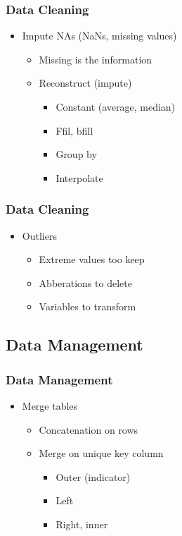 \begin{frame}\frametitle{Data Cleaning}
   \begin{itemize}
      \item Impute NAs (NaNs, missing values)
      \begin{itemize}
         \item Missing is the information
         \item Reconstruct (impute)
         \begin{itemize}
            \item Constant (average, median)
            \item Ffil, bfill
            \item Group by
            \item Interpolate
         \end{itemize}
      \end{itemize}
   \end{itemize}
\end{frame}


\begin{frame}\frametitle{Data Cleaning}
   \begin{itemize}
      \item Outliers
      \begin{itemize}
         \item Extreme values too keep
         \item Abberations to delete
         \item Variables to transform
      \end{itemize}
   \end{itemize}
\end{frame}


\subsection{Data Management}


\begin{frame}\frametitle{Data Management}
   \begin{itemize}
      \item Merge tables
      \begin{itemize}
         \item Concatenation on rows
         \item Merge on unique key column
         \begin{itemize}
            \item Outer (indicator)
            \item Left
            \item Right, inner
         \end{itemize}
      \end{itemize}
   \end{itemize}
\end{frame}


